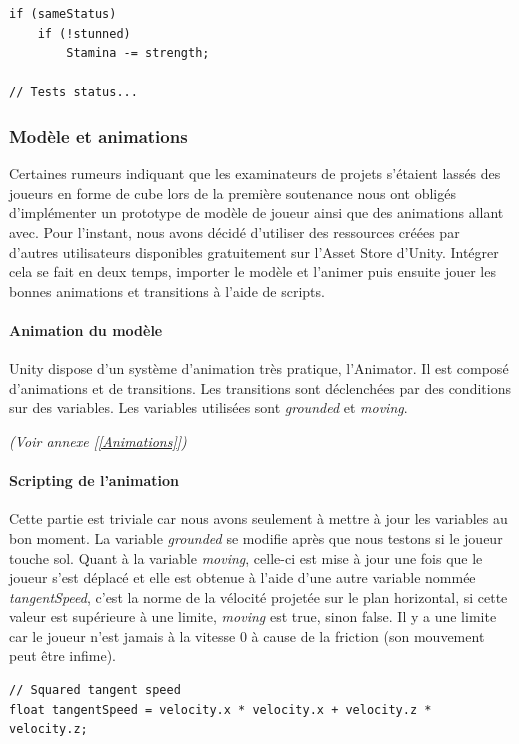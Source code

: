 \documentclass{article}
\begin{document}
\begin{lstlisting}
if (sameStatus)
    if (!stunned)
        Stamina -= strength;

// Tests status...
\end{lstlisting}

\newpage
\subsubsection{Modèle et animations}
Certaines rumeurs indiquant que les examinateurs de projets s'étaient lassés des joueurs en forme de cube lors de la première soutenance nous ont obligés d'implémenter un prototype de modèle de joueur ainsi que des animations allant avec. Pour l'instant, nous avons décidé d'utiliser des ressources créées par d'autres utilisateurs disponibles gratuitement sur l'Asset Store d'Unity. Intégrer cela se fait en deux temps, importer le modèle et l'animer puis ensuite jouer les bonnes animations et transitions à l'aide de scripts.
\paragraph{Animation du modèle}

Unity dispose d'un système d'animation très pratique, l'Animator. Il est composé d'animations et de transitions. Les transitions sont déclenchées par des conditions sur des variables. Les variables utilisées sont \emph{grounded} et \emph{moving}.

\emph{(Voir annexe [\ref{Animations}])}

\paragraph{Scripting de l'animation}
Cette partie est triviale car nous avons seulement à mettre à jour les variables au bon moment. La variable \emph{grounded} se modifie après que nous testons si le joueur touche sol. Quant à la variable \emph{moving}, celle-ci est mise à jour une fois que le joueur s'est déplacé et elle est obtenue à l'aide d'une autre variable nommée \emph{tangentSpeed}, c'est la norme de la vélocité projetée sur le plan horizontal, si cette valeur est supérieure à une limite, \emph{moving} est true, sinon false. Il y a une limite car le joueur n'est jamais à la vitesse 0 à cause de la friction (son mouvement peut être infime).

\begin{lstlisting}
// Squared tangent speed
float tangentSpeed = velocity.x * velocity.x + velocity.z * velocity.z;
\end{lstlisting}
\end{document}
